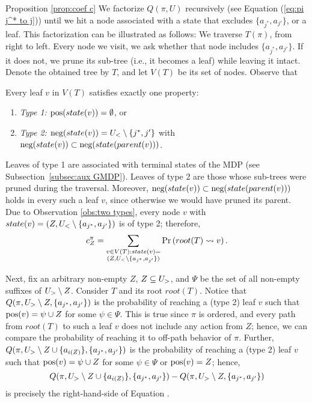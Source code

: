 \begin{proofof}{Proposition \ref{prop:coef c}}
We factorize $Q(\pi,U) $ recursively (see Equation (\ref{eq:pi j^* to j})) until we hit a node associated with a state that excludes $\{a_{j^*},a_{j'}\}$, or a leaf. This factorization can be illustrated as follows: We traverse $T(\pi)$, from right to left. Every node we visit, we ask whether that node includes $\{a_{j^*},a_{j'}\}$. If it does not, we prune its sub-tree (i.e., it becomes a leaf) while leaving it intact. Denote the obtained tree by $T$, and let $V(T)$ be its set of nodes. Observe that
\begin{observation}\label{obs:two types}
Every leaf $v$ in $V(T)$ satisfies exactly one property: 
\begin{enumerate}[leftmargin=0cm,itemindent=.5cm,labelwidth=\itemindent,labelsep=0cm,align=left]
\item[]\textit{Type 1:} $\textnormal{pos}(state(v))=\emptyset$, or
\item[]\textit{Type 2:} $\textnormal{neg}(state(v))=U_<\setminus \{j^*,j'\}$ with $\textnormal{neg}(state(v)) \subset \textnormal{neg}(state(parent(v)))$.
\end{enumerate}
\end{observation}
Leaves of type 1 are associated with terminal states of the MDP (see Subsection~\ref{subsec:aux GMDP}). Leaves of type 2 are those whose sub-trees were pruned during the traversal. Moreover, $\textnormal{neg}(state(v)) \subset \textnormal{neg}(state(parent(v)))$ holds in every such a leaf $v$, since otherwise we would have pruned its parent. Due to Observation \ref{obs:two types}, every node $v$ with $state(v)=(Z,U_<\setminus \{a_{j^*},a_{j'}\})$ is of type 2; therefore,
\begin{align}\label{eq:c with T}
c^\pi_Z = \sum_{\substack{v\in V(T):state(v)=\\(Z,U_<\setminus \{a_{j^*},a_{j'}\})}}\Pr\left(root(T)\stackrel{}{\rightsquigarrow}v\right).
\end{align}


Next, fix an arbitrary non-empty $Z$, $Z \subseteq U_>$, and $\Psi$ be the set of all non-empty suffixes of $U_>\setminus Z$. Consider $T$ and its root $root(T)$. Notice that $Q(\pi,U_>\setminus Z, \{a_{j^*},a_{j'}\})$ is the probability of reaching a (type 2) leaf $v$ such that $\textnormal{pos}(v)=\psi\cup Z$ for some $\psi \in \Psi$. This is true since $\pi$ is ordered, and every path from $root(T)$ to such a leaf $v$ does not include any action from $Z$; hence, we can compare the probability of reaching it to off-path behavior of $\pi$. Further, $Q(\pi,U_>\setminus Z \cup \{a_{i(Z)}\}, \{a_{j^*},a_{j'}\})$ is the probability of reaching a (type 2) leaf $v$ such that $\textnormal{pos}(v)=\psi\cup Z$ for some $\psi \in \Psi$ or $\textnormal{pos}(v)=Z$; hence,
\[
Q(\pi,U_>\setminus Z \cup \{a_{i(Z)}\}, \{a_{j^*},a_{j'}\})-Q(\pi,U_>\setminus Z, \{a_{j^*},a_{j'}\})
\]
is precisely the right-hand-side of Equation .
\end{proofof}



